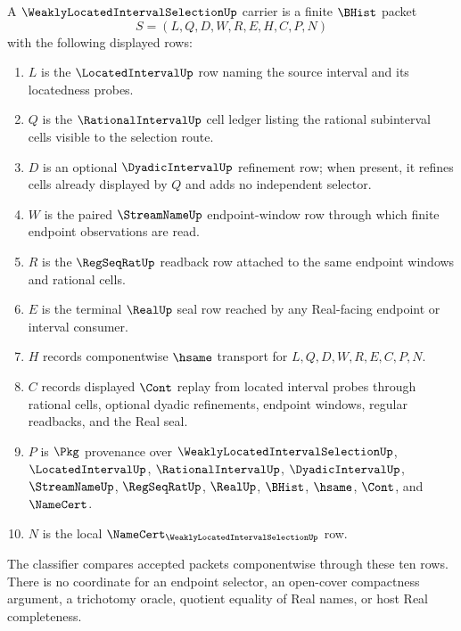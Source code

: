 \begin{definition}
\label{def:weakly-located-interval-selection-carrier}
A $\WeaklyLocatedIntervalSelectionUp$ carrier is a finite $\BHist$ packet
$$
S=(L,Q,D,W,R,E,H,C,P,N)
$$
with the following displayed rows:
\begin{enumerate}
\item $L$ is the $\LocatedIntervalUp$ row naming the source interval and its locatedness probes.
\item $Q$ is the $\RationalIntervalUp$ cell ledger listing the rational subinterval cells visible to the selection route.
\item $D$ is an optional $\DyadicIntervalUp$ refinement row; when present, it refines cells already displayed by $Q$ and adds no independent selector.
\item $W$ is the paired $\StreamNameUp$ endpoint-window row through which finite endpoint observations are read.
\item $R$ is the $\RegSeqRatUp$ readback row attached to the same endpoint windows and rational cells.
\item $E$ is the terminal $\RealUp$ seal row reached by any Real-facing endpoint or interval consumer.
\item $H$ records componentwise $\hsame$ transport for $L,Q,D,W,R,E,C,P,N$.
\item $C$ records displayed $\Cont$ replay from located interval probes through rational cells, optional dyadic refinements, endpoint windows, regular readbacks, and the Real seal.
\item $P$ is $\Pkg$ provenance over $\WeaklyLocatedIntervalSelectionUp$, $\LocatedIntervalUp$, $\RationalIntervalUp$, $\DyadicIntervalUp$, $\StreamNameUp$, $\RegSeqRatUp$, $\RealUp$, $\BHist$, $\hsame$, $\Cont$, and $\NameCert$.
\item $N$ is the local $\NameCert_{\WeaklyLocatedIntervalSelectionUp}$ row.
\end{enumerate}
The classifier compares accepted packets componentwise through these ten rows. There is no coordinate for an endpoint selector, an open-cover compactness argument, a trichotomy oracle, quotient equality of Real names, or host Real completeness.
\end{definition}

